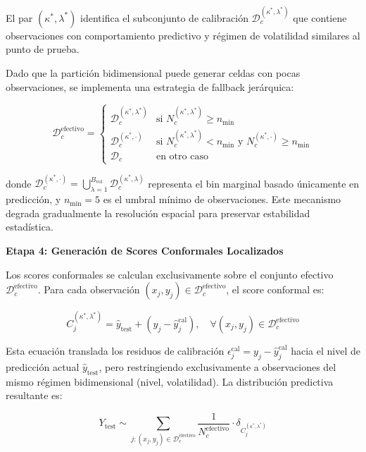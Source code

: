 El par $(\kappa^*, \lambda^*)$ identifica el subconjunto de calibración $\mathcal{D}_c^{(\kappa^*,\lambda^*)}$ que contiene observaciones con comportamiento predictivo y régimen de volatilidad similares al punto de prueba.

Dado que la partición bidimensional puede generar celdas con pocas observaciones, se implementa una estrategia de fallback jerárquica:

\begin{equation}
\mathcal{D}_c^{\text{efectivo}} = 
\begin{cases}
\mathcal{D}_c^{(\kappa^*,\lambda^*)} & \text{si } N_c^{(\kappa^*,\lambda^*)} \geq n_{\text{min}} \\
\mathcal{D}_c^{(\kappa^*, \cdot)} & \text{si } N_c^{(\kappa^*,\lambda^*)} < n_{\text{min}} \text{ y } N_c^{(\kappa^*, \cdot)} \geq n_{\text{min}} \\
\mathcal{D}_c & \text{en otro caso}
\end{cases}
\label{eq:avmcps_fallback}
\end{equation}

donde $\mathcal{D}_c^{(\kappa^*, \cdot)} = \bigcup_{\lambda=1}^{B_{\text{vol}}} \mathcal{D}_c^{(\kappa^*,\lambda)}$ representa el bin marginal basado únicamente en predicción, y $n_{\text{min}} = 5$ es el umbral mínimo de observaciones. Este mecanismo degrada gradualmente la resolución espacial para preservar estabilidad estadística.

\textbf{Etapa 4: Generación de Scores Conformales Localizados}

Los scores conformales se calculan exclusivamente sobre el conjunto efectivo $\mathcal{D}_c^{\text{efectivo}}$. Para cada observación $(x_j, y_j) \in \mathcal{D}_c^{\text{efectivo}}$, el score conformal es:

\begin{equation}
C_j^{(\kappa^*,\lambda^*)} = \hat{y}_{\text{test}} + \left(y_j - \hat{y}_j^{\text{cal}}\right), \quad \forall (x_j, y_j) \in \mathcal{D}_c^{\text{efectivo}}
\label{eq:avmcps_calibration_scores}
\end{equation}

Esta ecuación translada los residuos de calibración $\epsilon_j^{\text{cal}} = y_j - \hat{y}_j^{\text{cal}}$ hacia el nivel de predicción actual $\hat{y}_{\text{test}}$, pero restringiendo exclusivamente a observaciones del mismo régimen bidimensional (nivel, volatilidad). La distribución predictiva resultante es:

\begin{equation}
Y_{\text{test}} \sim \sum_{j: (x_j, y_j) \in \mathcal{D}_c^{\text{efectivo}}} \frac{1}{N_c^{\text{efectivo}}} \cdot \delta_{C_j^{(\kappa^*,\lambda^*)}}
\label{eq:avmcps_predictive_dist}
\end{equation}

